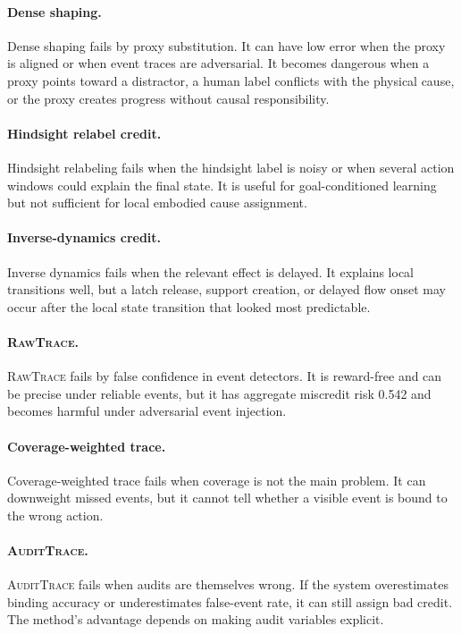 \documentclass{article}
\newcommand{\method}{\textsc{AuditTrace}\xspace}
\newcommand{\rawtrace}{\textsc{RawTrace}\xspace}
\begin{document}
\paragraph{Dense shaping.}
Dense shaping fails by proxy substitution. It can have low error when the proxy is aligned or when event traces are adversarial. It becomes dangerous when a proxy points toward a distractor, a human label conflicts with the physical cause, or the proxy creates progress without causal responsibility.

\paragraph{Hindsight relabel credit.}
Hindsight relabeling fails when the hindsight label is noisy or when several action windows could explain the final state. It is useful for goal-conditioned learning but not sufficient for local embodied cause assignment.

\paragraph{Inverse-dynamics credit.}
Inverse dynamics fails when the relevant effect is delayed. It explains local transitions well, but a latch release, support creation, or delayed flow onset may occur after the local state transition that looked most predictable.

\paragraph{\rawtrace.}
\rawtrace fails by false confidence in event detectors. It is reward-free and can be precise under reliable events, but it has aggregate miscredit risk 0.542 and becomes harmful under adversarial event injection.

\paragraph{Coverage-weighted trace.}
Coverage-weighted trace fails when coverage is not the main problem. It can downweight missed events, but it cannot tell whether a visible event is bound to the wrong action.

\paragraph{\method.}
\method fails when audits are themselves wrong. If the system overestimates binding accuracy or underestimates false-event rate, it can still assign bad credit. The method's advantage depends on making audit variables explicit.
\end{document}

